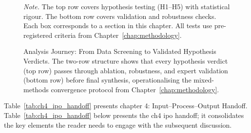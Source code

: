 \begin{figure}[!htbp]
{%
}
\caption[Analysis Journey]{Analysis Journey: From Data Screening to Validated Hypothesis Verdicts. The two-row structure shows that every hypothesis verdict (top row) passes through ablation, robustness, and expert validation (bottom row) before final synthesis, operationalising the mixed-methods convergence protocol from Chapter~\ref{chap:methodology}.}
\vspace{0.5em}\noindent\textit{Note.} The top row covers hypothesis testing (H1--H5) with statistical rigour. The bottom row covers validation and robustness checks. Each box corresponds to a section in this chapter. All tests use pre-registered criteria from Chapter~\ref{chap:methodology}.
\end{figure}

\noindent Table~\ref{tab:ch4_ipo_handoff} presents chapter 4: Input--Process--Output Handoff.
\noindent Table~\ref{tab:ch4_ipo_handoff} below presents the ch4 ipo handoff; it consolidates the key elements the reader needs to engage with the subsequent discussion.

